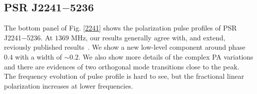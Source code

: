 \documentclass[useAMS,usenatbib]{mn2e}
\begin{document}
\begin{appendices}

\subsection{PSR J2241$-$5236}

The bottom panel of Fig. \ref{2241} shows the polarization pulse profiles of 
PSR J2241$-$5236.
%
At $1369$ MHz, our results generally agree with, and extend, reviously published 
results~\citep{Keith11}.
%
We show a new low-level component around phase $0.4$ with a width of $\sim 0.2$.
%
We also show more details of the complex PA variations and there are evidences 
of two orthogonal mode transitions close to the peak.
%
The frequency evolution of pulse profile is hard to see, but the fractional 
linear polarization increases at lower frequencies.




\end{appendices}
\end{document}
